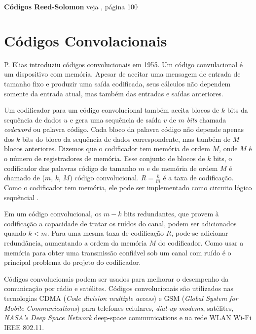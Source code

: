 \begin{example} {\bf Códigos Reed-Solomon} veja \cite{Hefez:2008}, página 100
\end{example}


\section{Códigos Convolacionais}

P. Elias introduziu códigos convolucionais em 1955. Um código convulacional é um dispositivo com memória. Apesar de aceitar uma mensagem de entrada de tamanho fixo e produzir uma saída codificada, seus cálculos não dependem somente da entrada atual, mas também das entradas e saídas anteriores.

Um codificador para um código convolucional também aceita blocos de $k$ bits da sequência de dados $u$ e gera uma sequência de saída $v$ de $m$ \emph{bits} chamada \emph{codeword} ou palavra código. Cada bloco da palavra código não depende apenas dos $k$ bits do bloco da sequência de dados correspondente, mas também de $M$ blocos anteriores. Dizemos que o codificador tem memória de ordem $M$, onde $M$ é o número de registradores de memória. Esse conjunto de blocos de $k$ bits, o codificador das palavras código de tamanho $m$ e de memória de ordem $M$ é chamado de ($m$, $k$, $M$) código convolucional. $R = \frac{k}{m}$  é a taxa de codificação. Como o codificador tem memória, ele pode ser implementado como circuito lógico sequêncial \cite{Lin:1983}.

Em um código convolucional, os $m - k$ bits redundantes, que provem à codificação a capacidade de tratar os ruídos do canal, podem ser adicionados quando $k < m$. Para uma mesma taxa de codificação $R$, pode-se adicionar redundância, aumentando a ordem da memória $M$ do codificador. Como usar a memória para obter uma transmissão confiável sob um canal com ruído é o principal problema do projeto do codificador.

Códigos convolucionais podem ser usados para melhorar o desempenho da comunicação por rádio e satélites. Códigos convolucionais são utilizados nas tecnologias CDMA (\emph{Code division multiple access}) e GSM (\emph{Global System for Mobile Communications}) para telefones celulares, \emph{dial-up modems}, satélites, \emph{NASA's Deep Space Network} deep-space communications e na rede WLAN Wi-Fi IEEE 802.11.


